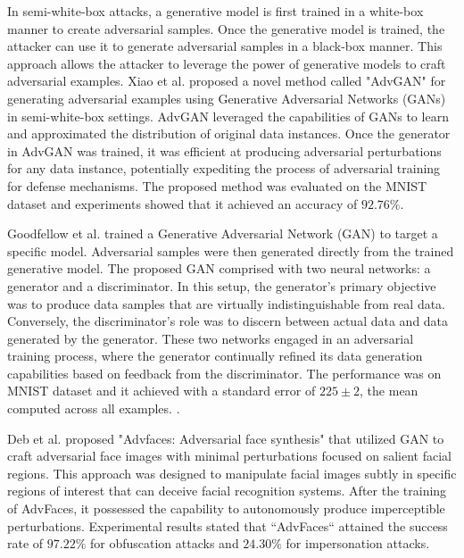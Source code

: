 \documentclass[sn-mathphys]{sn-jnl}%
\theoremstyle{thmstyleone}%
\theoremstyle{thmstyletwo}%
\theoremstyle{thmstylethree}%
\begin{document}
In semi-white-box attacks, a generative model is first trained in a white-box manner to create adversarial samples. Once the generative model is trained, the attacker can use it to generate adversarial samples in a black-box manner. This approach allows the attacker to leverage the power of generative models to craft adversarial examples. Xiao et al. \cite{xiao2018generating} proposed a novel method called "AdvGAN" for generating adversarial examples using Generative Adversarial Networks (GANs) in semi-white-box settings. AdvGAN leveraged the capabilities of GANs to learn and approximated the distribution of original data instances. Once the generator in AdvGAN was trained, it was efficient at producing adversarial perturbations for any data instance, potentially expediting the process of adversarial training for defense mechanisms. The proposed method was evaluated on the MNIST dataset and experiments showed that it achieved an accuracy of $92.76\%$.

 Goodfellow et al. \cite{goodfellow2014generative} trained a Generative Adversarial Network (GAN) to target a specific model. Adversarial samples were then generated directly from the trained generative model. The proposed GAN comprised with two neural networks: a generator and a discriminator. In this setup, the generator's primary objective was to produce data samples that are virtually indistinguishable from real data. Conversely, the discriminator's role was to discern between actual data and data generated by the generator. These two networks engaged in an adversarial training process, where the generator continually refined its data generation capabilities based on feedback from the discriminator. The performance was on MNIST dataset and it achieved with a standard error of $225\pm2$, the mean computed across all examples. .  
 
 Deb et al. \cite{deb2020advfaces} proposed "Advfaces: Adversarial face
synthesis" that utilized GAN to craft adversarial face images with minimal perturbations focused on salient facial regions. This approach was designed to manipulate facial images subtly in specific regions of interest that can deceive facial recognition systems. After the training of AdvFaces, it possessed the capability to autonomously produce imperceptible perturbations. Experimental results stated that ``AdvFaces`` attained the success rate of $97.22\%$ for obfuscation attacks and $24.30\%$ for impersonation attacks.
 
\end{document}
